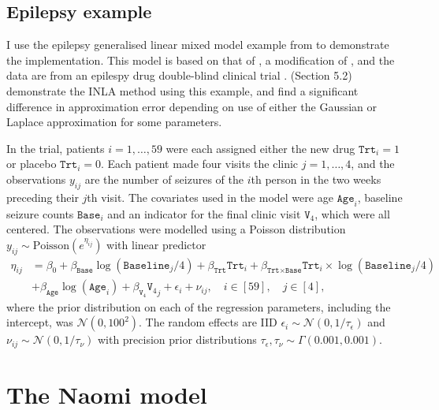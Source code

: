 \documentclass[a4paper, nobind]{templates/ociamthesis}
\begin{document}
\hypertarget{epilepsy-example}{%
\subsection{Epilepsy example}\label{epilepsy-example}}

I use the epilepsy generalised linear mixed model example from \textcite{spiegelhalter1996bugs} to demonstrate the implementation.
This model is based on that of \textcite{breslow1993approximate}, a modification of \textcite{thall1990some}, and the data are from an epilespy drug double-blind clinical trial \autocite{leppik1985double}.
\textcite{rue2009approximate} (Section 5.2) demonstrate the INLA method using this example, and find a significant difference in approximation error depending on use of either the Gaussian or Laplace approximation for some parameters.

In the trial, patients \(i = 1, \ldots, 59\) were each assigned either the new drug \(\texttt{Trt}_i = 1\) or placebo \(\texttt{Trt}_i = 0\).
Each patient made four visits the clinic \(j = 1, \ldots, 4\), and the observations \(y_{ij}\) are the number of seizures of the \(i\)th person in the two weeks preceding their \(j\)th visit.
The covariates used in the model were age \(\texttt{Age}_i\), baseline seizure counts \(\texttt{Base}_i\) and an indicator for the final clinic visit \(\texttt{V}_4\), which were all centered.
The observations were modelled using a Poisson distribution \(y_{ij} \sim \text{Poisson}(e^{\eta_{ij}})\) with linear predictor
\begin{align*}
\eta_{ij}
&= \beta_0 + \beta_\texttt{Base} \log(\texttt{Baseline}_j / 4) + \beta_\texttt{Trt} \texttt{Trt}_i +
   \beta_{\texttt{Trt} \times \texttt{Base}} \texttt{Trt}_i \times \log(\texttt{Baseline}_j / 4) \\ 
&+ \beta_\texttt{Age} \log(\texttt{Age}_i) + \beta_{\texttt{V}_4} {\texttt{V}_4}_j +
   \epsilon_i + \nu_{ij}, \quad i \in [59], \quad j \in [4],
\end{align*}
where the prior distribution on each of the regression parameters, including the intercept, was \(\mathcal{N}(0, 100^2)\).
The random effects are IID \(\epsilon_i \sim \mathcal{N}(0, 1/\tau_\epsilon)\) and \(\nu_{ij} \sim \mathcal{N}(0, 1/\tau_\nu)\) with precision prior distributions \(\tau_\epsilon, \tau_\nu \sim \Gamma(0.001, 0.001)\).

\hypertarget{the-naomi-model}{%
\section{The Naomi model}\label{the-naomi-model}}
\end{document}

